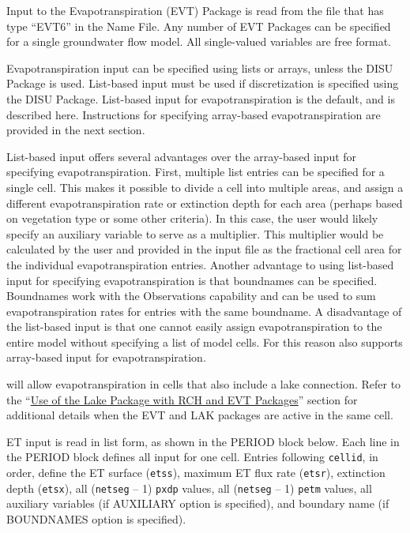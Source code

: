 Input to the Evapotranspiration (EVT) Package is read from the file that has type ``EVT6'' in the Name File. Any number of EVT Packages can be specified for a single groundwater flow model. All single-valued variables are free format.

Evapotranspiration input can be specified using lists or arrays, unless the DISU Package is used.  List-based input must be used if discretization is specified using the DISU Package.  List-based input for evapotranspiration is the default, and is described here.  Instructions for specifying array-based evapotranspiration are provided in the next section. 

List-based input offers several advantages over the array-based input for specifying evapotranspiration.  First, multiple list entries can be specified for a single cell.  This makes it possible to divide a cell into multiple areas, and assign a different evapotranspiration rate or extinction depth for each area (perhaps based on vegetation type or some other criteria).  In this case, the user would likely specify an auxiliary variable to serve as a multiplier.  This multiplier would be calculated by the user and provided in the input file as the fractional cell area for the individual evapotranspiration entries.  Another advantage to using list-based input for specifying evapotranspiration is that boundnames can be specified.  Boundnames work with the Observations capability and can be used to sum evapotranspiration rates for entries with the same boundname.  A disadvantage of the list-based input is that one cannot easily assign evapotranspiration to the entire model without specifying a list of model cells.  For this reason \mf also supports array-based input for evapotranspiration.

\mf will allow evapotranspiration in cells that also include a lake connection.  Refer to the ``\hyperref[sec:lakrchet]{Use of the Lake Package with RCH and EVT Packages}'' section for additional details when the EVT and LAK packages are active in the same cell.

ET input is read in list form, as shown in the PERIOD block below. Each line in the PERIOD block defines all input for one cell. Entries following \texttt{cellid}, in order, define the ET surface (\texttt{etss}), maximum ET flux rate (\texttt{etsr}), extinction depth (\texttt{etsx}), all (\texttt{netseg} -- 1) \texttt{pxdp} values, all (\texttt{netseg} -- 1) \texttt{petm} values, all auxiliary variables (if AUXILIARY option is specified), and boundary name (if BOUNDNAMES option is specified).

